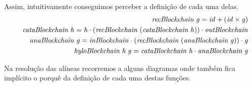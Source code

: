 \documentclass[a4paper]{article}
\newcommand{\Varid}[1]{\mathit{#1}}
\begin{document}
Assim, intuitivamente conseguimos perceber a definição de cada uma delas.
\begin{eqnarray*}
\start
\ensuremath{\Varid{recBlockchain}\;\Varid{g}\mathrel{=}\Varid{id}\mathbin{+}(\Varid{id}\times\Varid{g})}
\more
\ensuremath{\Varid{cataBlockchain}\;\Varid{h}\mathrel{=}\Varid{h}\comp (\Varid{recBlockchain}\;(\Varid{cataBlockchain}\;\Varid{h}))\comp \Varid{outBlockchain}}
\more
\ensuremath{\Varid{anaBlockchain}\;\Varid{g}\mathrel{=}\Varid{inBlockchain}\comp (\Varid{recBlockchain}\;(\Varid{anaBlockchain}\;\Varid{g}))\comp \Varid{g}}
\more
\ensuremath{\Varid{hyloBlockchain}\;\Varid{h}\;\Varid{g}\mathrel{=}\Varid{cataBlockchain}\;\Varid{h}\comp \Varid{anaBlockchain}\;\Varid{g}}
\end{eqnarray*}


Na resolução das alíneas recorremos a alguns diagramas onde também fica
implícito o porquê da definição de cada uma destas funções.
\end{document}
